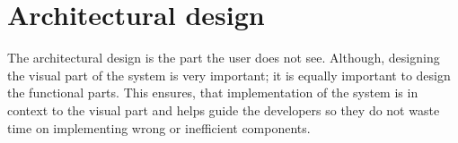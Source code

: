 \chapter{Architectural design}

The architectural design is the part the user does not see.
Although, designing the visual part of the system is very important; it is equally important to design the functional parts.
This ensures, that implementation of the system is in context to the visual part and helps guide the developers so they do not waste time on implementing wrong or inefficient components.